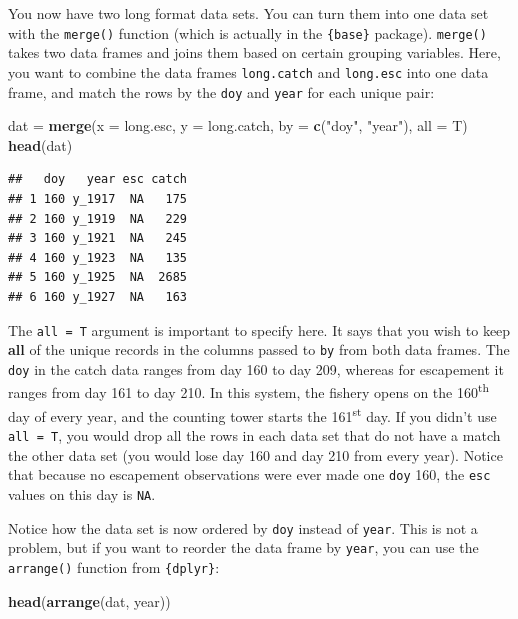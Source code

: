 \documentclass[]{book}
\newenvironment{Shaded}{\begin{snugshade}}{\end{snugshade}}
\newcommand{\KeywordTok}[1]{\textcolor[rgb]{0.13,0.29,0.53}{\textbf{#1}}}
\newcommand{\DataTypeTok}[1]{\textcolor[rgb]{0.13,0.29,0.53}{#1}}
\newcommand{\StringTok}[1]{\textcolor[rgb]{0.31,0.60,0.02}{#1}}
\newcommand{\NormalTok}[1]{#1}
\theoremstyle{definition}
\theoremstyle{definition}
\theoremstyle{definition}
\theoremstyle{remark}
\begin{document}
You now have two long format data sets. You can turn them into one data
set with the \texttt{merge()} function (which is actually in the
\texttt{\{base\}} package). \texttt{merge()} takes two data frames and
joins them based on certain grouping variables. Here, you want to
combine the data frames \texttt{long.catch} and \texttt{long.esc} into
one data frame, and match the rows by the \texttt{doy} and \texttt{year}
for each unique pair:

\begin{Shaded}
\begin{Highlighting}[]
\NormalTok{dat =}\StringTok{ }\KeywordTok{merge}\NormalTok{(}\DataTypeTok{x =}\NormalTok{ long.esc, }\DataTypeTok{y =}\NormalTok{ long.catch,}
            \DataTypeTok{by =} \KeywordTok{c}\NormalTok{(}\StringTok{"doy"}\NormalTok{, }\StringTok{"year"}\NormalTok{), }\DataTypeTok{all =}\NormalTok{ T)}
\KeywordTok{head}\NormalTok{(dat)}
\end{Highlighting}
\end{Shaded}

\begin{verbatim}
##   doy   year esc catch
## 1 160 y_1917  NA   175
## 2 160 y_1919  NA   229
## 3 160 y_1921  NA   245
## 4 160 y_1923  NA   135
## 5 160 y_1925  NA  2685
## 6 160 y_1927  NA   163
\end{verbatim}

The \texttt{all\ =\ T} argument is important to specify here. It says
that you wish to keep \textbf{all} of the unique records in the columns
passed to \texttt{by} from both data frames. The \texttt{doy} in the
catch data ranges from day 160 to day 209, whereas for escapement it
ranges from day 161 to day 210. In this system, the fishery opens on the
160\textsuperscript{th} day of every year, and the counting tower starts
the 161\textsuperscript{st} day. If you didn't use \texttt{all\ =\ T},
you would drop all the rows in each data set that do not have a match
the other data set (you would lose day 160 and day 210 from every year).
Notice that because no escapement observations were ever made one
\texttt{doy} 160, the \texttt{esc} values on this day is \texttt{NA}.

Notice how the data set is now ordered by \texttt{doy} instead of
\texttt{year}. This is not a problem, but if you want to reorder the
data frame by \texttt{year}, you can use the \texttt{arrange()} function
from \texttt{\{dplyr\}}:

\begin{Shaded}
\begin{Highlighting}[]
\KeywordTok{head}\NormalTok{(}\KeywordTok{arrange}\NormalTok{(dat, year))}
\end{Highlighting}
\end{Shaded}
\end{document}
